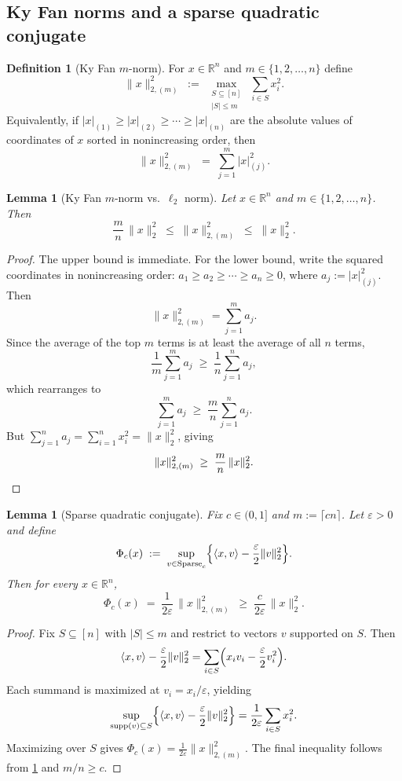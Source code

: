 \documentclass[11pt,reqno,letterpaper]{amsart}
\numberwithin{equation}{section}
\newtheorem{lemma}[theorem]{Lemma}
\theoremstyle{definition}
\newtheorem{definition}[theorem]{Definition}
\let\originalleft\left
\let\originalright\right
\renewcommand{\left}{\mathopen{}\mathclose\bgroup\originalleft}
\renewcommand{\right}{\aftergroup\egroup\originalright}
\begin{document}
\subsection{Ky Fan norms and a sparse quadratic conjugate}

\begin{definition}[Ky Fan $m$-norm]\label{def:kyfan}
For $x\in\mathbb{R}^n$ and $m\in\{1,2,\dots,n\}$ define
\[
\|x\|_{2,(m)}^2 \;:=\; \max_{\substack{S\subseteq[n]\\ |S|\le m}}\ \sum_{i\in S} x_i^2.
\]
Equivalently, if $|x|_{(1)}\ge |x|_{(2)}\ge \cdots \ge |x|_{(n)}$ are the absolute values of coordinates of $x$
sorted in nonincreasing order, then
\[
\|x\|_{2,(m)}^2 \;=\; \sum_{j=1}^{m} |x|_{(j)}^2.
\]
\end{definition}

\begin{lemma}[Ky Fan $m$-norm vs.\ $\ell_2$ norm]\label{lem:kyfan_vs_l2}
Let $x\in\mathbb{R}^n$ and $m\in\{1,2,\dots,n\}$. Then
\[
\frac{m}{n}\,\|x\|_2^2 \;\le\; \|x\|_{2,(m)}^2 \;\le\; \|x\|_2^2.
\]
\end{lemma}

\begin{proof} The upper bound is immediate. For the lower bound, write the squared coordinates in nonincreasing order: $a_1\ge a_2\ge \cdots\ge a_n\ge 0$, where $a_j:=|x|_{(j)}^2$. Then \[ \|x\|_{2,(m)}^2=\sum_{j=1}^m a_j. \] Since the average of the top $m$ terms is at least the average of all $n$ terms, \[ \frac{1}{m}\sum_{j=1}^m a_j \;\ge\; \frac{1}{n}\sum_{j=1}^n a_j, \] which rearranges to \[ \sum_{j=1}^m a_j \;\ge\; \frac{m}{n}\sum_{j=1}^n a_j. \] But $\sum_{j=1}^n a_j=\sum_{i=1}^n x_i^2=\|x\|_2^2$, giving \[ \|x\|_{2,(m)}^2 \;\ge\; \frac{m}{n}\,\|x\|_2^2. \qedhere \] \end{proof}

\begin{lemma}[Sparse quadratic conjugate]\label{lem:sparse-conjugate}
Fix $c\in(0,1]$ and $m:=\lceil cn\rceil$. Let $\varepsilon>0$ and define
\[
\Phi_c(x)\;:=\;\sup_{v\in \mathrm{Sparse}_c}\left\{\langle x,v\rangle-\frac{\varepsilon}{2}\|v\|_2^2\right\}.
\]
Then for every $x\in\mathbb{R}^n$,
\[
\Phi_c(x)\;=\;\frac{1}{2\varepsilon}\,\|x\|_{2,(m)}^2
\;\ge\; \frac{c}{2\varepsilon}\,\|x\|_2^2.
\]
\end{lemma}

\begin{proof}
Fix $S\subseteq[n]$ with $|S|\le m$ and restrict to vectors $v$ supported on $S$. Then
\[
\langle x,v\rangle-\frac{\varepsilon}{2}\|v\|_2^2
=\sum_{i\in S}\left(x_iv_i-\frac{\varepsilon}{2}v_i^2\right).
\]
Each summand is maximized at $v_i=x_i/\varepsilon$, yielding
\[
\sup_{\mathrm{supp}(v)\subseteq S}\left\{\langle x,v\rangle-\frac{\varepsilon}{2}\|v\|_2^2\right\}
=\frac{1}{2\varepsilon}\sum_{i\in S}x_i^2.
\]
Maximizing over $S$ gives $\Phi_c(x)=\frac{1}{2\varepsilon}\|x\|_{2,(m)}^2$.
The final inequality follows from \cref{lem:kyfan_vs_l2} and $m/n\ge c$.
\end{proof}
\end{document}
